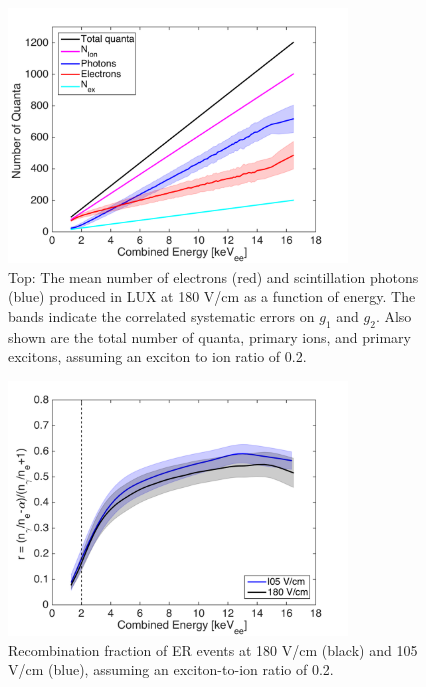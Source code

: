 \begin{figure}[h!]\centering
\includegraphics[width=90mm]{fig/quanta-vs-energy.png}
\caption{Top: The mean number of electrons (red) and scintillation photons (blue) produced in LUX at 180 V/cm as a function of energy. The bands indicate the correlated systematic errors on $g_1$ and $g_2$. Also shown are the total number of quanta, primary ions, and primary excitons, assuming an exciton to ion ratio of 0.2. }
\label{fig:quanta-vs-energy}
\end{figure}

\begin{figure}[h!]\centering
\includegraphics[width=90mm]{fig/recombination.png}
\caption{Recombination fraction of ER events at 180 V/cm (black) and 105 V/cm (blue), assuming an exciton-to-ion ratio of 0.2.}
\label{fig:recombination}
\end{figure}

